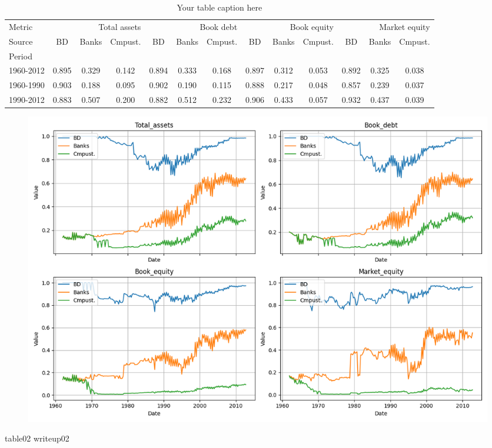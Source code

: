 \documentclass{article}
\begin{document}
\begin{adjustbox}{max width=\textwidth}

    \usepackage{booktabs} %
    \usepackage{graphicx} %
    \usepackage{adjustbox} %

    \begin{table}[htbp]
      \centering
      \caption{Your table caption here}
      \label{tab:yourlabel}
      \begin{adjustbox}{max width=\textwidth}
      \small
      \begin{tabular}{lcccccccccccc}
\toprule
Metric & \multicolumn{3}{r}{Total assets} & \multicolumn{3}{r}{Book debt} & \multicolumn{3}{r}{Book equity} & \multicolumn{3}{r}{Market equity} \\
Source & BD & Banks & Cmpust. & BD & Banks & Cmpust. & BD & Banks & Cmpust. & BD & Banks & Cmpust. \\
Period &  &  &  &  &  &  &  &  &  &  &  &  \\
\midrule
1960-2012 & 0.895 & 0.329 & 0.142 & 0.894 & 0.333 & 0.168 & 0.897 & 0.312 & 0.053 & 0.892 & 0.325 & 0.038 \\
1960-1990 & 0.903 & 0.188 & 0.095 & 0.902 & 0.190 & 0.115 & 0.888 & 0.217 & 0.048 & 0.857 & 0.239 & 0.037 \\
1990-2012 & 0.883 & 0.507 & 0.200 & 0.882 & 0.512 & 0.232 & 0.906 & 0.433 & 0.057 & 0.932 & 0.437 & 0.039 \\
\bottomrule
\end{tabular}

      \end{adjustbox}
    \end{table}
    \end{adjustbox}

\begin{figure}[htbp]\centering\includegraphics[width=\linewidth]{table02_figure.png}\caption{}\end{figure}\par
\par
table02 writeup02\par
\end{document}
